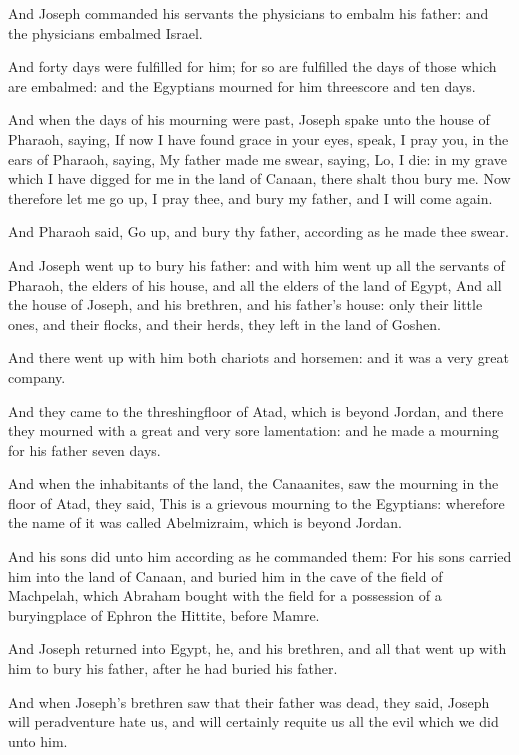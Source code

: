 \Verse And Joseph commanded his servants the physicians to embalm his father: and the physicians embalmed Israel.

\Verse And forty days were fulfilled for him; for so are fulfilled the days of those which are embalmed: and the Egyptians mourned for him threescore and ten days.

\Verse And when the days of his mourning were past, Joseph spake unto the house of Pharaoh, saying, If now I have found grace in your eyes, speak, I pray you, in the ears of Pharaoh, saying, \Verse My father made me swear, saying, Lo, I die: in my grave which I have digged for me in the land of Canaan, there shalt thou bury me. Now therefore let me go up, I pray thee, and bury my father, and I will come again.

\Verse And Pharaoh said, Go up, and bury thy father, according as he made thee swear.

\Verse And Joseph went up to bury his father: and with him went up all the servants of Pharaoh, the elders of his house, and all the elders of the land of Egypt, \Verse And all the house of Joseph, and his brethren, and his father's house: only their little ones, and their flocks, and their herds, they left in the land of Goshen.

\Verse And there went up with him both chariots and horsemen: and it was a very great company.

\Verse And they came to the threshingfloor of Atad, which is beyond Jordan, and there they mourned with a great and very sore lamentation: and he made a mourning for his father seven days.

\Verse And when the inhabitants of the land, the Canaanites, saw the mourning in the floor of Atad, they said, This is a grievous mourning to the Egyptians: wherefore the name of it was called Abelmizraim, which is beyond Jordan.

\Verse And his sons did unto him according as he commanded them: \Verse For his sons carried him into the land of Canaan, and buried him in the cave of the field of Machpelah, which Abraham bought with the field for a possession of a buryingplace of Ephron the Hittite, before Mamre.

\Verse And Joseph returned into Egypt, he, and his brethren, and all that went up with him to bury his father, after he had buried his father.

\Verse And when Joseph's brethren saw that their father was dead, they said, Joseph will peradventure hate us, and will certainly requite us all the evil which we did unto him.

